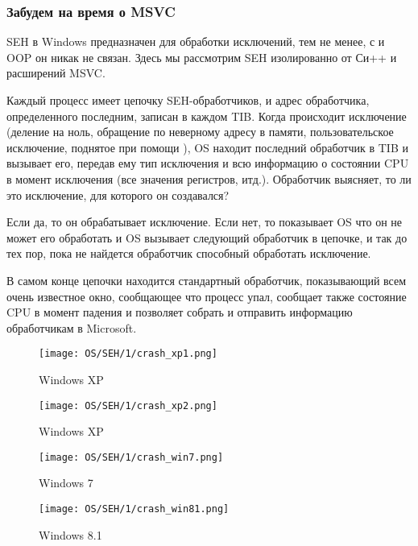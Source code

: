 \subsubsection{Забудем на время о MSVC}

\ac{SEH} в Windows предназначен для обработки исключений, тем не менее, с \Cpp и \ac{OOP} он никак не связан.
Здесь мы рассмотрим \ac{SEH} изолированно от Си++ и расширений MSVC.

Каждый процесс имеет цепочку \ac{SEH}-обработчиков, и адрес обработчика, определенного последним, записан в каждом \ac{TIB}.
Когда происходит исключение (деление на ноль, обращение по неверному адресу в памяти, 
пользовательское исключение, поднятое при помощи ),
\ac{OS} находит последний обработчик в \ac{TIB} и вызывает его, 
передав ему тип исключения и всю информацию о состоянии \ac{CPU} в момент исключения
(все значения регистров, итд.).
Обработчик выясняет, то ли это исключение, для которого он создавался?

Если да, то он обрабатывает исключение.
Если нет, то показывает \ac{OS} что он не может его обработать и \ac{OS} вызывает следующий обработчик
в цепочке, и так до тех пор, пока не найдется обработчик способный обработать исключение.

В самом конце цепочки находится стандартный обработчик, показывающий всем очень известное окно, 
сообщающее что процесс упал, 
сообщает также состояние \ac{CPU} в момент падения и позволяет собрать и отправить информацию обработчикам 
в Microsoft. 

\begin{figure}[H]
\centering
\texttt{[image: OS/SEH/1/crash\_xp1.png]}
\caption{Windows XP}
\end{figure}

\begin{figure}[H]
\centering
\texttt{[image: OS/SEH/1/crash\_xp2.png]}
\caption{Windows XP}
\end{figure}

\begin{figure}[H]
\centering
\texttt{[image: OS/SEH/1/crash\_win7.png]}
\caption{Windows 7}
\end{figure}

\begin{figure}[H]
\centering
\texttt{[image: OS/SEH/1/crash\_win81.png]}
\caption{Windows 8.1}
\end{figure}

